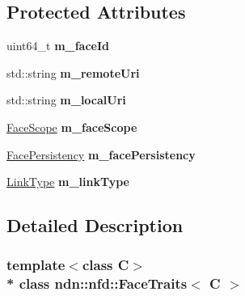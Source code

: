 \subsection*{Protected Attributes}
\begin{DoxyCompactItemize}
\item 
uint64\+\_\+t {\bfseries m\+\_\+face\+Id}\hypertarget{classndn_1_1nfd_1_1FaceTraits_a1168aa166d7d2e523cbef4419eef36c3}{}\label{classndn_1_1nfd_1_1FaceTraits_a1168aa166d7d2e523cbef4419eef36c3}

\item 
std\+::string {\bfseries m\+\_\+remote\+Uri}\hypertarget{classndn_1_1nfd_1_1FaceTraits_ae00d5eb79cc04deb330cad8f01d610a7}{}\label{classndn_1_1nfd_1_1FaceTraits_ae00d5eb79cc04deb330cad8f01d610a7}

\item 
std\+::string {\bfseries m\+\_\+local\+Uri}\hypertarget{classndn_1_1nfd_1_1FaceTraits_a89f8bff4a281ad3e91f86ed5576d5fb5}{}\label{classndn_1_1nfd_1_1FaceTraits_a89f8bff4a281ad3e91f86ed5576d5fb5}

\item 
\hyperlink{group__management_gaa49e0fd703a14e5bf904d15428fd6059}{Face\+Scope} {\bfseries m\+\_\+face\+Scope}\hypertarget{classndn_1_1nfd_1_1FaceTraits_ad4ee9310f2cfe5af06627f4404c6bcdf}{}\label{classndn_1_1nfd_1_1FaceTraits_ad4ee9310f2cfe5af06627f4404c6bcdf}

\item 
\hyperlink{group__management_ga05df4b7c484a0fae25d3e65962511bac}{Face\+Persistency} {\bfseries m\+\_\+face\+Persistency}\hypertarget{classndn_1_1nfd_1_1FaceTraits_a4587b607edc6b00f54e1f69015a62f39}{}\label{classndn_1_1nfd_1_1FaceTraits_a4587b607edc6b00f54e1f69015a62f39}

\item 
\hyperlink{group__management_gaa49a53cb4fe262ed33b001ccbe9c3502}{Link\+Type} {\bfseries m\+\_\+link\+Type}\hypertarget{classndn_1_1nfd_1_1FaceTraits_a6d933849dd47614dd01facc7c7ae0873}{}\label{classndn_1_1nfd_1_1FaceTraits_a6d933849dd47614dd01facc7c7ae0873}

\end{DoxyCompactItemize}


\subsection{Detailed Description}
\subsubsection*{template$<$class C$>$\\*
class ndn\+::nfd\+::\+Face\+Traits$<$ C $>$}

